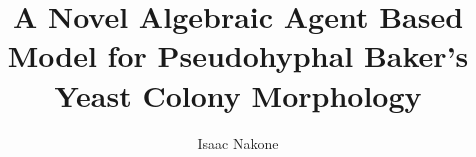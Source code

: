 \documentclass[published]{uofathesis}
\title{A Novel Algebraic Agent Based Model for Pseudohyphal Baker's Yeast Colony Morphology}
\author{Isaac Nakone}
\begin{document}
\frontmatter
\maketitle

\tableofcontents
\listoftables
\listoffigures

\makedeclaration




\mainmatter









\begin{appendices}
\renewcommand{\thesection}{A.\arabic{section}}
 
\end{appendices}

\backmatter







\printbibliography
\end{document}
